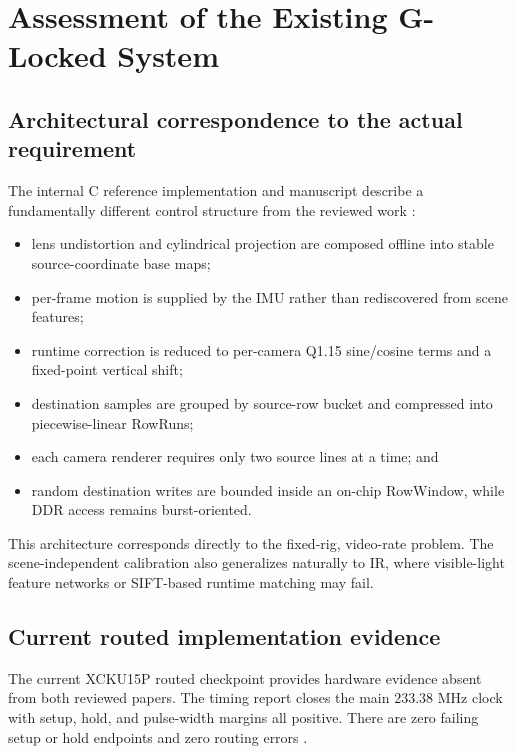 \documentclass[10pt]{article}
\begin{document}
\section{Assessment of the Existing G-Locked System}

\subsection{Architectural correspondence to the actual requirement}

The internal C reference implementation and manuscript describe a fundamentally different control structure from the reviewed work \cite{glocked,internalc}:

\begin{itemize}
  \item lens undistortion and cylindrical projection are composed offline into stable source-coordinate base maps;
  \item per-frame motion is supplied by the IMU rather than rediscovered from scene features;
  \item runtime correction is reduced to per-camera Q1.15 sine/cosine terms and a fixed-point vertical shift;
  \item destination samples are grouped by source-row bucket and compressed into piecewise-linear RowRuns;
  \item each camera renderer requires only two source lines at a time; and
  \item random destination writes are bounded inside an on-chip RowWindow, while DDR access remains burst-oriented.
\end{itemize}

This architecture corresponds directly to the fixed-rig, video-rate problem. The scene-independent calibration also generalizes naturally to IR, where visible-light feature networks or SIFT-based runtime matching may fail.

\subsection{Current routed implementation evidence}

The current XCKU15P routed checkpoint provides hardware evidence absent from both reviewed papers. The timing report closes the main $233.38$ MHz clock with setup, hold, and pulse-width margins all positive. There are zero failing setup or hold endpoints and zero routing errors \cite{vivado}.
\end{document}
